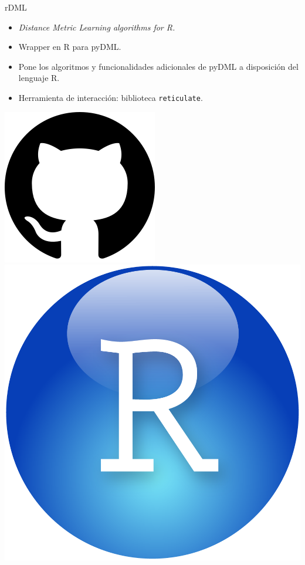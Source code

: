 \documentclass[10pt, compress]{beamer}
\begin{document}
\begin{frame}{rDML}
  \begin{itemize}
    \item \textit{Distance Metric Learning algorithms for R.}
    \item Wrapper en R para pyDML.
    \item Pone los algoritmos y funcionalidades adicionales de pyDML a disposición del lenguaje R.
    \item Herramienta de interacción: biblioteca \texttt{reticulate}.
  \end{itemize}

  \begin{center}
    \includegraphics[height=0.15\textheight]{images/github.png}
    \hspace{0.1\textwidth}
    \includegraphics[height=0.15\textheight]{images/Rstudio.png}

\end{center}
\end{frame}
\end{document}
